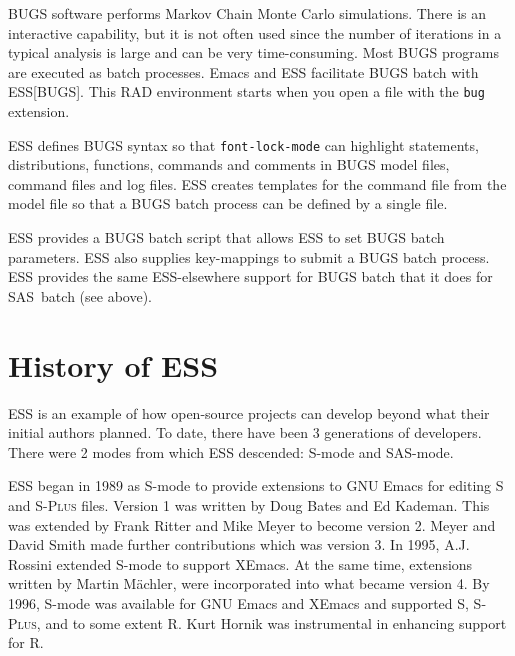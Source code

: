 \documentclass{article}
\newcommand*{\SAS}{\textsc{SAS}}
\newcommand*{\Splus}{\textsc{S-Plus}}
\newcommand{\stexttt}[1]{{\small\texttt{#1}}}
\begin{document}
BUGS software performs Markov Chain Monte Carlo simulations.  There is an 
interactive capability, but it is not often used since the number of iterations
in a typical analysis is large and can be very time-consuming.  Most BUGS 
programs are executed as batch processes.  Emacs and ESS facilitate BUGS batch 
with ESS[BUGS].  This RAD environment starts when you open a file with the 
\stexttt{bug} extension.

ESS defines BUGS syntax so that \stexttt{font-lock-mode} can highlight
statements, distributions, functions, commands and comments in BUGS
model files, command files and log files.  ESS creates templates
for the command file from the model file so that a BUGS batch process
can be defined by a single file.

ESS provides a BUGS batch script that allows ESS to set BUGS batch 
parameters.  ESS also supplies key-mappings to submit a BUGS batch
process.  ESS provides the same ESS-elsewhere support for BUGS batch
that it does for \SAS\ batch (see above).

\section{History of ESS}
\label{sec:ESS:history}

ESS is an example of how open-source projects can develop beyond what 
their initial authors planned.  To date, there have been 3 generations 
of developers.
There were 2 modes from which ESS descended:  S-mode and SAS-mode.

ESS began in 1989 as S-mode to provide extensions to GNU Emacs for editing 
S and \Splus{} files.  Version 1 was written by Doug Bates and Ed Kademan.  
This was extended by Frank Ritter and Mike Meyer to become version 2.  Meyer 
and David Smith made further contributions which was version 3.
In 1995, A.J. Rossini extended S-mode to support XEmacs.  At the same time, 
extensions written by Martin M{\"a}chler, were incorporated into what became
version 4.  By 1996, S-mode was available for GNU Emacs and XEmacs and supported S, 
\Splus, and to some extent R.  Kurt Hornik was instrumental in enhancing support
for R.
\end{document}
